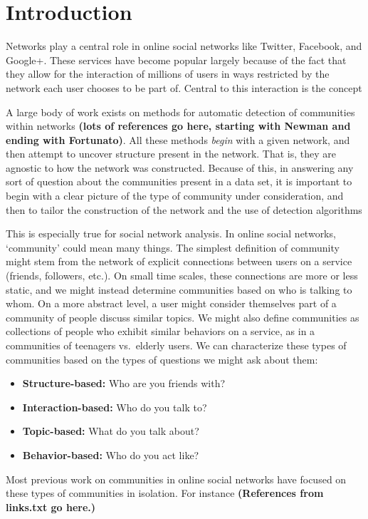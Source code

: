 \section{Introduction}

Networks play a central role in online social networks like Twitter, Facebook, and Google+. These services have become popular largely because of the fact that they allow for the interaction of millions of users in ways restricted by the network each user chooses to be part of. Central to this interaction is the concept 

A large body of work exists on methods for automatic detection of communities within networks \textbf{(lots of references go here, starting with Newman and ending with Fortunato)}. All these methods \emph{begin} with a given network, and then attempt to uncover structure present in the network. That is, they are agnostic to how the network was constructed. Because of this, in answering any sort of question about the communities present in a data set, it is important to begin with a clear picture of the type of community under consideration, and then to tailor the construction of the network and the use of detection algorithms 

This is especially true for social network analysis. In online social networks, `community' could mean many things. The simplest definition of community might stem from the network of explicit connections between users on a service (friends, followers, etc.). On small time scales, these connections are more or less static, and we might instead determine communities based on who is talking to whom. On a more abstract level, a user might consider themselves part of a community of people discuss similar topics. We might also define communities as collections of people who exhibit similar behaviors on a service, as in a communities of teenagers vs.\ elderly users. We can characterize these types of communities based on the types of questions we might ask about them:
\begin{itemize}
	\item \textbf{Structure-based:} Who are you friends with?
	\item \textbf{Interaction-based:} Who do you talk to?
	\item \textbf{Topic-based:} What do you talk about?
	\item \textbf{Behavior-based:}  Who do you act like?
\end{itemize}

Most previous work on communities in online social networks have focused on these types of communities in isolation. For instance \textbf{(References from links.txt go here.)}

